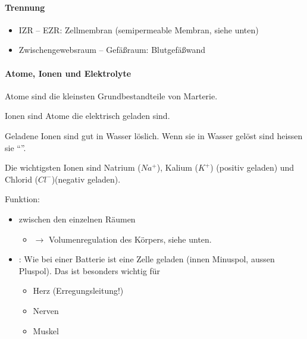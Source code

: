 \paragraph{Trennung} 

\begin{itemize}
    \item IZR -- EZR:    Zellmembran (semipermeable Membran, siehe unten)
    \item Zwischengewebsraum -- Gef\"a{\ss}raum:  Blutgef\"a{\ss}wand
\end{itemize}


\paragraph{Atome, Ionen und Elektrolyte}
\label{topic:elektrolyte}

Atome sind die kleinsten Grundbestandteile von Marterie.

Ionen sind Atome die elektrisch geladen sind.

Geladene Ionen sind gut in Wasser l\"oslich. Wenn sie in Wasser gel\"ost
sind heissen sie
"`"'.


Die wichtigsten Ionen sind Natrium ($Na^+$), Kalium ($K^+$)
(positiv geladen) und Chlorid ($Cl^-$)(negativ geladen). 

Funktion:

\begin{itemize}
    \item {} zwischen den einzelnen R\"aumen 
    \begin{itemize}
        \item ${\rightarrow}$ Volumenregulation des K\"orpers, siehe unten.
    \end{itemize}
    \item {}: Wie bei einer Batterie
    ist eine Zelle geladen (innen Minuspol, aussen Pluspol). Das ist besonders wichtig f\"ur
    \begin{itemize}
        \item Herz (Erregungsleitung!)
        \item Nerven
        \item Muskel
    \end{itemize}
\end{itemize}

